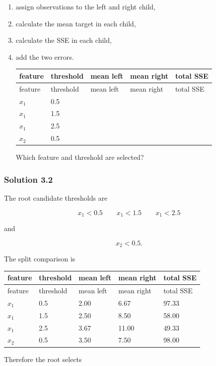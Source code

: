 \documentclass[10pt]{article}
\begin{document}
\begin{enumerate}
\item
assign observations to the left and right child,

\item
calculate the mean target in each child,

\item
calculate the SSE in each child,

\item
add the two errors.

\begingroup
\small
\setlength{\tabcolsep}{4pt}
\begin{longtable}{l|l|l|l|l}
feature & threshold & mean left & mean right & total SSE \\
\hline
\endfirsthead
feature & threshold & mean left & mean right & total SSE \\
\hline
\endhead
$x_1$ & 0.5 &  &  &  \\[3pt]
$x_1$ & 1.5 &  &  &  \\[3pt]
$x_1$ & 2.5 &  &  &  \\[3pt]
$x_2$ & 0.5 &  &  &  \\[3pt]
\end{longtable}
\endgroup
Which feature and threshold are selected?

\end{enumerate}
\begingroup\color{red}

\subsubsection*{Solution 3.2}
The root candidate thresholds are

\[
x_1<0.5\qquad
x_1<1.5\qquad
x_1<2.5
\]

and

\[
x_2<0.5.
\]

The split comparison is

\begingroup
\small
\setlength{\tabcolsep}{4pt}
\begin{longtable}{l|l|l|l|l}
feature & threshold & mean left & mean right & total SSE \\
\hline
\endfirsthead
feature & threshold & mean left & mean right & total SSE \\
\hline
\endhead
$x_1$ & 0.5 & 2.00 & 6.67 & 97.33 \\[1.5pt]
$x_1$ & 1.5 & 2.50 & 8.50 & 58.00 \\[1.5pt]
$x_1$ & 2.5 & 3.67 & 11.00 & 49.33 \\[1.5pt]
$x_2$ & 0.5 & 3.50 & 7.50 & 98.00 \\[1.5pt]
\end{longtable}
\endgroup
Therefore the root selects
\end{document}
